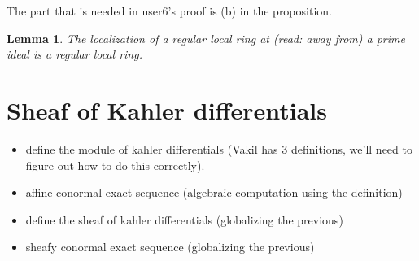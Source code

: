 \documentclass[a4paper]{article}
\newtheorem{lem}[thm]{Lemma}
\newtheorem{prop}[thm]{Proposition}
\newcommand{\Spec}{\operatorname{Spec}}
\begin{document}
The part that is needed in user6's proof is (b) in the proposition.

\begin{lem}
	The localization of a regular local ring at (read: away from) a prime 
	ideal is a regular local ring.
\end{lem}



%
%			
%
%

\section{Sheaf of Kahler differentials}

\begin{itemize}
	\item define the module of kahler differentials
		(Vakil has 3 definitions, we'll need to figure out 
		how to do this correctly).
    \item affine conormal exact sequence
		(algebraic computation using the definition)
	\item define the sheaf of kahler differentials
		(globalizing the previous)
	\item sheafy conormal exact sequence
		(globalizing the previous)
\end{itemize}
\end{document}
